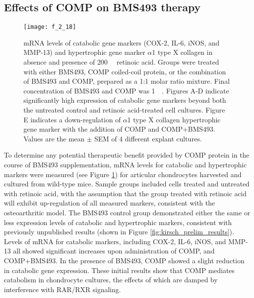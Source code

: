 \begin{refsection}
\subsection{Effects of COMP on BMS493 therapy}
\label{sec:bms493_results}
\begin{figure}[h!] \centering \texttt{[image: f\_2\_18]}
    \caption{mRNA levels of catabolic gene markers (COX-2, IL-6, iNOS, and
        MMP-13) and hypertrophic gene marker ${\alpha}$1 type X collagen in
        absence and presence of \SI{200}{\nano\moLar} retinoic acid. Groups were
        treated with either BMS493, COMP coiled-coil protein, or the
        combination of BMS493 and COMP, prepared as a 1:1 molar ratio mixture.
        Final concentration of BMS493 and COMP was \SI{1}{\micro\moLar}. Figures
        A-D indicate significantly high expression of catabolic gene markers
        beyond both the untreated control and retinoic acid-treated cell
        cultures. Figure E indicates a down-regulation of ${\alpha}$1 type X
        collagen hypertrophic gene marker with the addition of COMP and
        COMP+BMS493. Values are the mean ${\pm}$ SEM of 4 different explant
    cultures.}
    \label{fig:pcr_panel} \end{figure}
To determine any potential therapeutic benefit provided by COMP protein in the
course of BMS493 supplementation, mRNA levels for catabolic and hypertrophic
markers were measured (see Figure \ref{fig:pcr_panel}) for articular
chondrocytes harvested and cultured from wild-type mice. Sample groups included
cells treated and untreated with retinoic acid, with the assumption that the
group treated with retinoic acid will exhibit up-regulation of all measured
markers, consistent with the  osteoarthritic
model.\cite{Davies2009,Cohen2006a} The BMS493 control group demonstrated either
the same or less expression levels of catabolic and hypertrophic markers,
consistent with previously unpublished results (shown in Figure
\ref{fig:kirsch_prelim_results}).
Levels of mRNA for catabolic markers, including COX-2, IL-6, iNOS, and MMP-13
all showed significant increases upon administration of COMP, and COMP+BMS493.
In the presence of BMS493, COMP showed a slight reduction in catabolic gene
expression. These initial results show that COMP mediates catabolism in
chondrocyte cultures, the effects of which are damped by interference with
RAR/RXR signaling.


\end{refsection}

